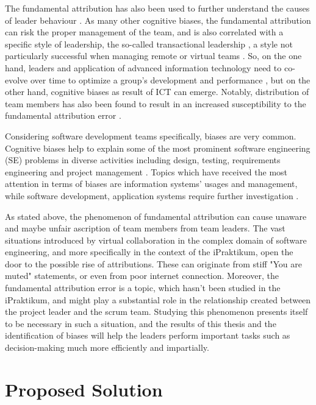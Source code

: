 \documentclass[a4paper]{article}
\begin{document}
The fundamental attribution has also been used to further understand the causes of leader behaviour \cite{Green1979}. As many other cognitive biases, the fundamental attribution can risk the proper management of the team, and is also correlated with a specific style of leadership, the so-called transactional leadership \cite{Masood2012}, a style not particularly successful when managing remote or virtual teams \cite{Howell2005} \cite{Purvanova2009}. So, on the one hand, leaders and application of advanced information technology need to co-evolve over time to optimize a group's development and performance \cite{Avolio2000}, but on the other hand, cognitive biases as result of ICT can emerge. Notably, distribution of team members has also been found to result in an increased susceptibility to the fundamental attribution error \cite{Thompson2006}. 

Considering software development teams specifically, biases are very common. Cognitive biases help to explain some of the most prominent software engineering (SE) problems in diverse activities including design, testing, requirements engineering  and project management \cite{Mohanai2018}. Topics which have received the most attention in terms of biases are information systems' usages and management, while software development, application systems require further investigation \cite{Fleischmann2014}.

As stated above, the phenomenon of fundamental attribution can cause unaware and maybe unfair ascription of team members from team leaders. The vast situations introduced by virtual collaboration in the complex domain of software engineering, and more specifically in the context of the iPraktikum, open the door to the possible rise of attributions. These can originate from stiff "You are muted" statements, or even from poor internet connection. Moreover, the fundamental attribution error is a topic, which hasn't been studied in the iPraktikum, and might play a substantial role in the relationship created between the project leader and the scrum team. Studying this phenomenon presents itself to be necessary in such a situation, and the results of this thesis and the identification of biases will help the leaders perform important tasks such as decision-making much more efficiently and impartially.

\section{Proposed Solution}
\end{document}
